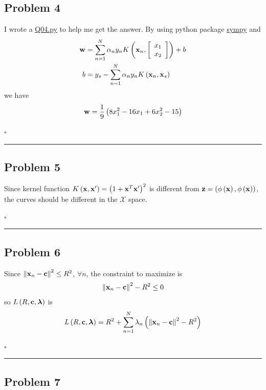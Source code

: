 \documentclass[12pt]{article}
\newcommand*{\QEDB}{\hfill\ensuremath{\square}}
\newcommand{\SBrackets}[1]{\left[#1\right]}
\newcommand{\ParTh}[1]{\left(#1\right)}
\newcommand{\BF}[1]{{\bf#1}}
\newcommand{\VecAbsVal}[1]{\left\|#1\right\|}
\newcommand{\Matrix}[2]{\SBrackets{\begin{array}{#1}#2\end{array}}}
\newcommand{\horrule}[1]{\rule{\linewidth}{#1}}
\begin{document}
\subsection*{Problem 4}

I wrote a \url{Q04.py} to help me get the answer. By using python package \url{sympy} and
\begin{align}
\BF{w}&=\sum_{n=1}^{N}\alpha_ny_nK\ParTh{\BF{x}_n,\Matrix{c}{x_1\\x_2}}+b\\
b&=y_s-\sum_{n=1}^{N}\alpha_ny_nK\ParTh{\BF{x}_n,\BF{x}_s}
\end{align}
we have
\begin{align}
\BF{w}=\dfrac{1}{9}\ParTh{8x^2_1 - 16x_1 + 6x^2_2-15}
\end{align}

\QEDB

\horrule{0.5pt}

\subsection*{Problem 5}

Since kernel function $K\ParTh{\BF{x},\BF{x}^\prime}=\ParTh{1+\BF{x}^T\BF{x}^\prime}^2$ is different from $\BF{z}=\ParTh{\phi\ParTh{\BF{x}},\phi\ParTh{\BF{x}}}$, the curves should be different in the $\mathcal{X}$ space.

\QEDB

\horrule{0.5pt}

\subsection*{Problem 6}

Since $\VecAbsVal{\BF{x}_n-\BF{c}}^2\leq R^2$, $\forall n$, the constraint to maximize is
\begin{align}
\VecAbsVal{\BF{x}_n-\BF{c}}^2-R^2\leq0
\end{align}
so $L\ParTh{R,\BF{c},\bm{\lambda}}$ is
\begin{align}
L\ParTh{R,\BF{c},\bm{\lambda}}=R^2+\sum_{n=1}^{N}\lambda_n\ParTh{\VecAbsVal{\BF{x}_n-\BF{c}}^2-R^2}
\end{align}

\QEDB

\horrule{0.5pt}

\subsection*{Problem 7}
\end{document}

